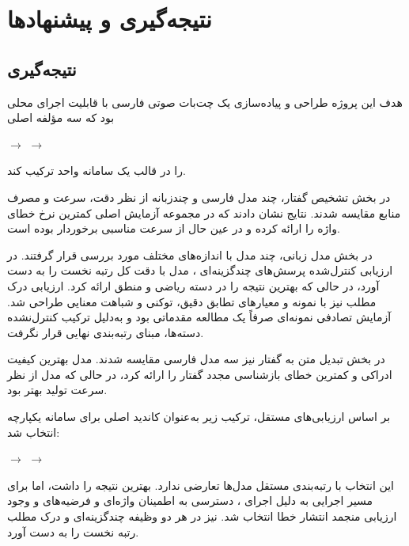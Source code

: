 
\chapter{نتیجه‌گیری و پیشنهادها}

\section{نتیجه‌گیری}

هدف این پروژه طراحی و پیاده‌سازی یک چت‌بات صوتی فارسی با
قابلیت اجرای محلی بود که سه مؤلفه اصلی

\begin{center}
$\longrightarrow$
$\longrightarrow$
\end{center}

را در قالب یک سامانه واحد ترکیب کند.

در بخش تشخیص گفتار، چند مدل فارسی و چندزبانه از نظر دقت،
سرعت و مصرف منابع مقایسه شدند.
نتایج نشان دادند که
در مجموعه آزمایش اصلی کمترین نرخ خطای واژه را ارائه کرده و
در عین حال از سرعت مناسبی برخوردار بوده است.

در بخش مدل زبانی، چند مدل با اندازه‌های مختلف مورد بررسی
قرار گرفتند.
در ارزیابی کنترل‌شده پرسش‌های چندگزینه‌ای ، مدل
 با دقت کل  رتبه نخست را به دست آورد،
در حالی که  بهترین نتیجه را در دسته ریاضی و منطق
ارائه کرد. ارزیابی درک مطلب نیز با  نمونه 
و معیارهای تطابق دقیق،  توکنی و شباهت معنایی طراحی شد.
آزمایش تصادفی  نمونه‌ای  صرفاً یک مطالعه
مقدماتی بود و به‌دلیل ترکیب کنترل‌نشده دسته‌ها، مبنای رتبه‌بندی
نهایی قرار نگرفت.

در بخش تبدیل متن به گفتار نیز سه مدل فارسی مقایسه شدند.
مدل
بهترین کیفیت ادراکی و کمترین خطای بازشناسی مجدد گفتار را
ارائه کرد، در حالی که مدل  از نظر سرعت تولید بهتر بود.

بر اساس ارزیابی‌های مستقل، ترکیب زیر به‌عنوان کاندید اصلی
برای سامانه یکپارچه انتخاب شد:

\begin{center}
$\longrightarrow$
$\longrightarrow$
\end{center}

این انتخاب با رتبه‌بندی مستقل مدل‌ها تعارضی ندارد. 
بهترین نتیجه  را داشت، اما  برای
مسیر اجرایی به دلیل اجرای ، دسترسی به اطمینان واژه‌ای و
فرضیه‌های  و وجود ارزیابی منجمد انتشار خطا انتخاب شد.
 نیز در هر دو وظیفه چندگزینه‌ای و درک مطلب رتبه
نخست را به دست آورد.


